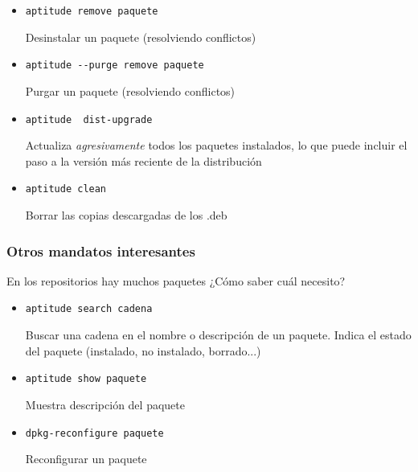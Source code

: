 \documentclass[ucs]{beamer}
\begin{document}
\begin{frame}[fragile]

\begin{itemize}	
\item 
\verb|aptitude remove paquete|

Desinstalar un paquete (resolviendo conflictos)  

\item 
\verb|aptitude --purge remove paquete|

Purgar un paquete (resolviendo conflictos)  
\item 
\verb|aptitude  dist-upgrade|

Actualiza \emph{agresivamente} todos los paquetes instalados, lo que
puede incluir el paso a la versión más reciente de la distribución

\item 
\verb|aptitude clean|

Borrar las copias descargadas de los .deb
\end{itemize}

\end{frame}


\begin{frame}[fragile]
\frametitle{Otros mandatos interesantes}
En los repositorios hay muchos paquetes
¿Cómo saber cuál necesito?

\begin{itemize}
\item 
\verb|aptitude search cadena| 

Buscar una cadena en el nombre o descripción de un paquete. Indica
el estado del paquete (instalado, no instalado, borrado...)



%
\item 
\verb|aptitude show paquete|

Muestra descripción del paquete

\item 
\verb|dpkg-reconfigure paquete|

Reconfigurar un paquete

%
\end{itemize}

\end{frame}
\end{document}
